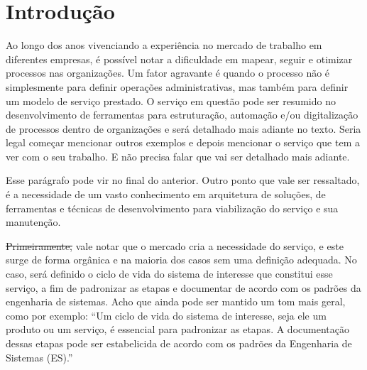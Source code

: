 
\chapter{Introdução}\label{chap:introducao} %

	Ao longo dos anos vivenciando a experiência no mercado de trabalho em diferentes 
	empresas, é possível notar a dificuldade em mapear, seguir e otimizar processos 
	nas organizações. Um fator agravante é quando o processo não é simplesmente 
	para definir operações administrativas, mas também para definir um modelo de 
	serviço prestado. O serviço em questão pode ser resumido no desenvolvimento de 
	ferramentas para estruturação, automação e/ou digitalização de processos dentro 
	de organizações e será detalhado mais adiante no texto. {\color{red} Seria legal começar mencionar outros exemplos e depois mencionar o serviço que tem a ver com o seu trabalho. E não precisa falar que vai ser detalhado mais adiante.}

	{\color{red} Esse parágrafo pode vir no final do anterior.} Outro ponto que vale ser ressaltado, é a necessidade de um vasto conhecimento 
	em arquitetura de soluções, de ferramentas e técnicas de desenvolvimento para 
	viabilização do serviço e sua manutenção. 

	\sout{Primeiramente,} vale notar que o mercado cria a necessidade do serviço, e este 
	surge de forma orgânica e na maioria dos casos sem uma definição adequada. No 
	caso, será definido o ciclo de vida do sistema de interesse que constitui esse 
	serviço, a fim de padronizar as etapas e documentar de acordo com os padrões da 
	engenharia de sistemas. {\color{red} Acho que ainda pode ser mantido um tom mais geral, como por exemplo: ``Um ciclo de vida do sistema de interesse, seja ele um produto ou um serviço, é essencial para padronizar as etapas. A documentação dessas etapas pode ser estabelicida de acordo com os padrões da Engenharia de Sistemas (ES).''}

